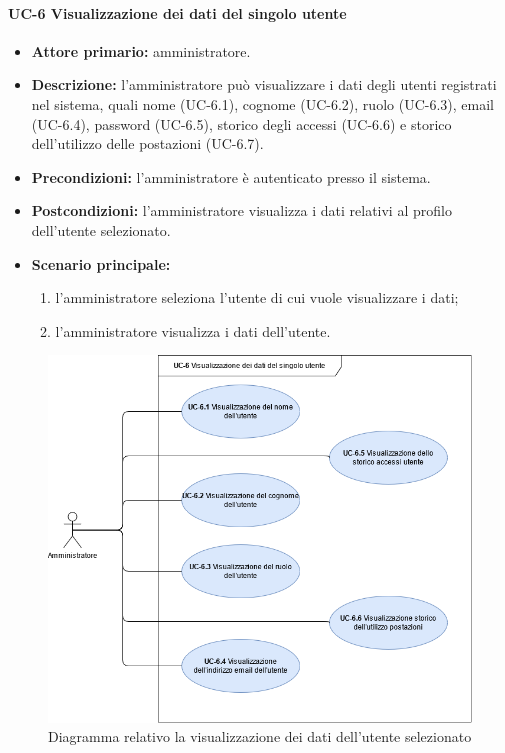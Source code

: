 \paragraph{UC-6 Visualizzazione dei dati del singolo utente}
\begin{itemize}
	\item \textbf{Attore primario:} amministratore.

	\item \textbf{Descrizione:} l'amministratore può visualizzare i dati degli utenti registrati nel sistema, quali nome (UC-6.1), cognome (UC-6.2), ruolo (UC-6.3), email (UC-6.4), password (UC-6.5), storico degli accessi (UC-6.6) e storico dell'utilizzo delle postazioni (UC-6.7).
	
	\item \textbf{Precondizioni:} l'amministratore è autenticato presso il sistema.

	\item \textbf{Postcondizioni:} l'amministratore visualizza i dati relativi al profilo dell'utente selezionato.

	\item \textbf{Scenario principale:}
	\begin{enumerate}
    	\item  l'amministratore seleziona l'utente di cui vuole visualizzare i dati;
    	\item  l'amministratore visualizza i dati dell'utente.
	\end{enumerate}
\end{itemize}

\begin{figure}[H]
    \centering
      \includegraphics[scale=0.45]{src/CasiDUso/immagini/DatiUtente.png}
    \caption{Diagramma relativo la visualizzazione dei dati dell'utente selezionato}
\end{figure}

